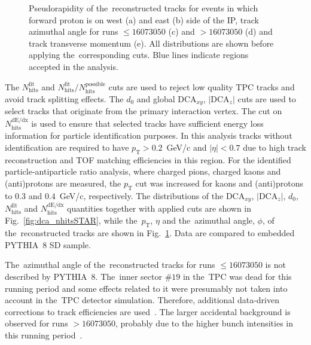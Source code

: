 \begin{figure}[h!]
\begin{subfigure}{.45\textwidth}
		\caption{}
	\end{subfigure}
	\begin{minipage}{.45\textwidth}
		

		\caption{Pseudorapidity of the~reconstructed tracks for events in which forward proton is on  west (a) and east (b) side of the IP, track azimuthal angle for runs $\leq 16073050$ (c) and $>16073050$ (d) and track transverse momentum (e). All distributions are shown before applying  the~corresponding cuts. Blue lines indicate regions accepted in the analysis.}
		\label{fig:ptEtaPhiSTAR}
	\end{minipage}
\end{figure}


The $N_{\textrm{hits}}^{\textrm{fit}}$ and $N_{\textrm{hits}}^{\textrm{fit}}/N_{\textrm{hits}}^{\textrm{possible}}$ cuts are used to reject low quality TPC tracks and avoid track splitting effects. The $d_0$ and global $\textrm{DCA}_{xy}$,  $|\textrm{DCA}_{z}|$ cuts are used to select tracks that originate from the primary interaction vertex. The cut on $N_{\textrm{hits}}^{\textrm{dE/dx}}$ is used to ensure that selected tracks have sufficient energy loss information
for particle identification purposes. In this analysis tracks without identification are required to have $p_\textrm{T} > 0.2$~GeV/c and $|\eta| < 0.7$ due to high track reconstruction and TOF matching efficiencies in this region. For the identified particle-antiparticle ratio analysis, where charged pions, charged kaons and (anti)protons  are measured, the $p_\textrm{T}$ cut was increased for kaons and (anti)protons  to $0.3$ and $0.4$~GeV/c, respectively. 
The distributions of the $\textrm{DCA}_{xy}$, $|\textrm{DCA}_{z}|$, $d_0$, $N_{\textrm{hits}}^{\textrm{fit}}$ and $N_{\textrm{hits}}^{\textrm{dE/dx}}$ quantities together with applied cuts are shown in Fig.~\ref{fig:dca_nhitsSTAR}, while the~$p_\textrm{T}$, $\eta$ and  the~azimuthal angle, $\phi$, of the~reconstructed tracks are shown in Fig.~\ref{fig:ptEtaPhiSTAR}. Data are compared to embedded PYTHIA~8 SD sample.

 The~azimuthal angle of the~reconstructed tracks for runs $\leq 16073050$ is not described by PYTHIA~8.
The~inner sector $\#19$ in the~TPC was dead for this running period and some effects related to it were presumably not taken into account in the~TPC detector simulation. Therefore, additional data-driven corrections to track efficiencies are used~\cite{supplementaryNote}.
The larger accidental background is  observed for  runs $>16073050$, probably due to the higher bunch intensities in this running period~\cite{starLumi}.

